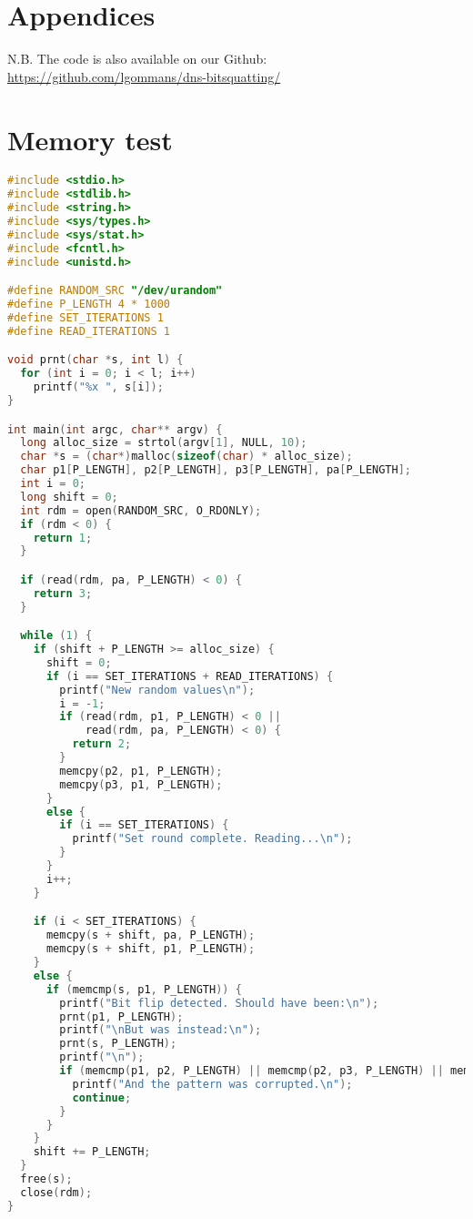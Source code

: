 \begin{appendices}

\section*{Appendices}

N.B. The code is also available on our Github: \\
\url{https://github.com/lgommans/dns-bitsquatting/}

\section{Memory test}\label{Apdx-memory}
\begin{lstlisting}[language=C]
#include <stdio.h>
#include <stdlib.h>
#include <string.h>
#include <sys/types.h>
#include <sys/stat.h>
#include <fcntl.h>
#include <unistd.h>

#define RANDOM_SRC "/dev/urandom"
#define P_LENGTH 4 * 1000
#define SET_ITERATIONS 1
#define READ_ITERATIONS 1

void prnt(char *s, int l) {
  for (int i = 0; i < l; i++)
    printf("%x ", s[i]);
}

int main(int argc, char** argv) {
  long alloc_size = strtol(argv[1], NULL, 10);
  char *s = (char*)malloc(sizeof(char) * alloc_size);
  char p1[P_LENGTH], p2[P_LENGTH], p3[P_LENGTH], pa[P_LENGTH];
  int i = 0;
  long shift = 0;
  int rdm = open(RANDOM_SRC, O_RDONLY);
  if (rdm < 0) {
    return 1;
  }

  if (read(rdm, pa, P_LENGTH) < 0) {
    return 3;
  }

  while (1) {
    if (shift + P_LENGTH >= alloc_size) {
      shift = 0;
      if (i == SET_ITERATIONS + READ_ITERATIONS) {
        printf("New random values\n");
        i = -1;
        if (read(rdm, p1, P_LENGTH) < 0 ||
            read(rdm, pa, P_LENGTH) < 0) {
          return 2;
        }
        memcpy(p2, p1, P_LENGTH);
        memcpy(p3, p1, P_LENGTH);
      }
      else {
        if (i == SET_ITERATIONS) {
          printf("Set round complete. Reading...\n");
        }
      }
      i++;
    }

    if (i < SET_ITERATIONS) {
      memcpy(s + shift, pa, P_LENGTH);
      memcpy(s + shift, p1, P_LENGTH);
    }
    else {
      if (memcmp(s, p1, P_LENGTH)) {
        printf("Bit flip detected. Should have been:\n");
        prnt(p1, P_LENGTH);
        printf("\nBut was instead:\n");
        prnt(s, P_LENGTH);
        printf("\n");
        if (memcmp(p1, p2, P_LENGTH) || memcmp(p2, p3, P_LENGTH) || memcmp(p1, p3, P_LENGTH)) {
          printf("And the pattern was corrupted.\n");
          continue;
        }
      }
    }
    shift += P_LENGTH;
  }
  free(s);
  close(rdm);
}
\end{lstlisting}


\end{appendices}
